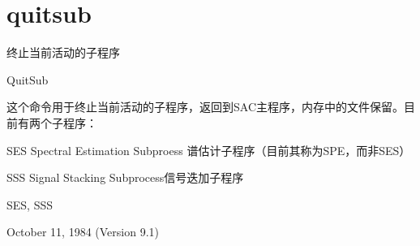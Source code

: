 \section{quitsub}
\label{cmd:quitsub}

终止当前活动的子程序

QuitSub

这个命令用于终止当前活动的子程序，返回到SAC主程序，内存中的文件保留。目前有两个子程序：

SES Spectral Estimation Subproess 谱估计子程序（目前其称为SPE，而非SES）

SSS Signal Stacking Subprocess信号迭加子程序

SES, SSS

October 11, 1984 (Version 9.1)
